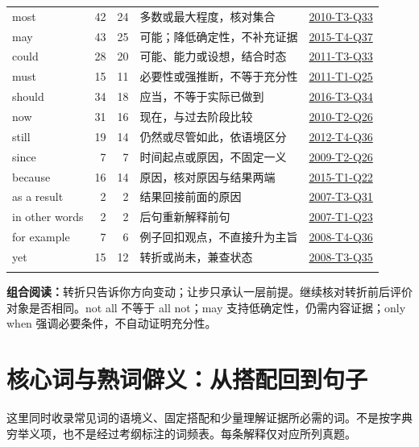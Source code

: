 \documentclass[11pt,a4paper]{article}
\begin{document}
\begin{longtable}{@{}p{2.6cm}rrp{6.4cm}p{2.6cm}@{}}
most & 42 & 24 & 多数或最大程度，核对集合 & \hyperref[idx-2010-T3-Q33]{2010-T3-Q33}\\\addlinespace[2pt]
may & 43 & 25 & 可能；降低确定性，不补充证据 & \hyperref[idx-2015-T4-Q37]{2015-T4-Q37}\\\addlinespace[2pt]
could & 28 & 20 & 可能、能力或设想，结合时态 & \hyperref[idx-2011-T3-Q33]{2011-T3-Q33}\\\addlinespace[2pt]
must & 15 & 11 & 必要性或强推断，不等于充分性 & \hyperref[idx-2011-T1-Q25]{2011-T1-Q25}\\\addlinespace[2pt]
should & 34 & 18 & 应当，不等于实际已做到 & \hyperref[idx-2016-T3-Q34]{2016-T3-Q34}\\\addlinespace[2pt]
now & 31 & 16 & 现在，与过去阶段比较 & \hyperref[idx-2010-T2-Q26]{2010-T2-Q26}\\\addlinespace[2pt]
still & 19 & 14 & 仍然或尽管如此，依语境区分 & \hyperref[idx-2012-T4-Q36]{2012-T4-Q36}\\\addlinespace[2pt]
since & 7 & 7 & 时间起点或原因，不固定一义 & \hyperref[idx-2009-T2-Q26]{2009-T2-Q26}\\\addlinespace[2pt]
because & 16 & 14 & 原因，核对原因与结果两端 & \hyperref[idx-2015-T1-Q22]{2015-T1-Q22}\\\addlinespace[2pt]
as a result & 2 & 2 & 结果回接前面的原因 & \hyperref[idx-2007-T3-Q31]{2007-T3-Q31}\\\addlinespace[2pt]
in other words & 2 & 2 & 后句重新解释前句 & \hyperref[idx-2007-T1-Q23]{2007-T1-Q23}\\\addlinespace[2pt]
for example & 7 & 6 & 例子回扣观点，不直接升为主旨 & \hyperref[idx-2008-T4-Q36]{2008-T4-Q36}\\\addlinespace[2pt]
yet & 15 & 12 & 转折或尚未，兼查状态 & \hyperref[idx-2008-T3-Q35]{2008-T3-Q35}\\\addlinespace[2pt]
\bottomrule\end{longtable}
\noindent\textbf{组合阅读：}转折只告诉你方向变动；让步只承认一层前提。继续核对转折前后评价对象是否相同。not all 不等于 all not；may 支持低确定性，仍需内容证据；only when 强调必要条件，不自动证明充分性。\par
\clearpage\section{核心词与熟词僻义：从搭配回到句子}\label{vocabulary}
这里同时收录常见词的语境义、固定搭配和少量理解证据所必需的词。不是按字典穷举义项，也不是经过考纲标注的词频表。每条解释仅对应所列真题。\par
\end{document}
